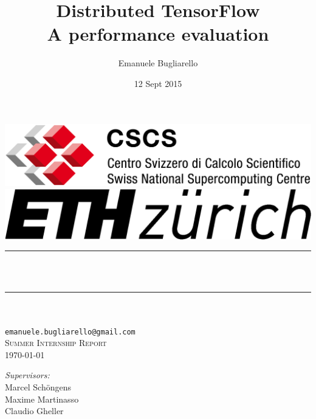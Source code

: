 \documentclass[12pt]{article}
\title{Distributed TensorFlow \\[10pt] {\LARGE A performance evaluation}}								%
\author{Emanuele Bugliarello}								%
\date{12 Sept 2015}											%
\makeatletter
\let\thetitle\@title
\let\theauthor\@author
\makeatother
\begin{document}

\begin{titlepage}
	\centering
    \includegraphics[scale = 0.5]{logocscs.png}\hfill\includegraphics[scale = 0.85]{logoethz.png}\\[2.0 cm]	%
    
	\rule{\linewidth}{0.4 mm} \\[0.4 cm]
	{ \huge \bfseries \thetitle}\\[0.4 cm]
	\rule{\linewidth}{0.4 mm} \\[0.5 cm]
    
    \textsc{\LARGE \theauthor}\\[0.25 cm]
    {\large\texttt{emanuele.bugliarello@gmail.com}}\\[2.0 cm]	%

	\textsc{\Large Summer Internship Report}\\[0.5 cm]	%

    \textsc{\Large \today}\\[3.0 cm]				%
    
	\begin{flushleft} \large
		\emph{Supervisors:}\\
		Marcel Schöngens\\
        Maxime Martinasso\\
        Claudio Gheller\\
    \end{flushleft}
	
\end{titlepage}


\tableofcontents
\pagebreak

\end{document}

